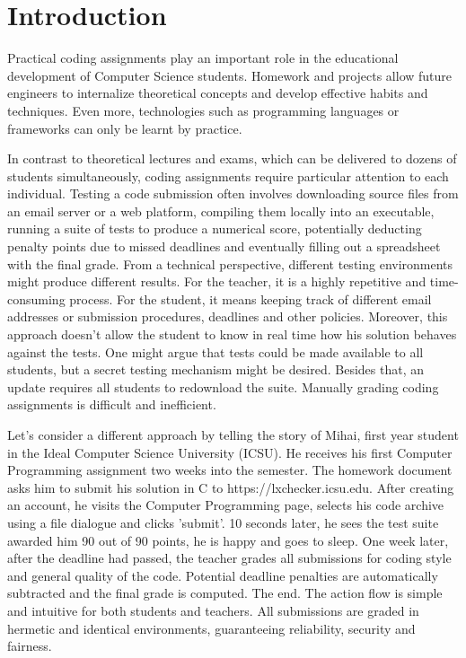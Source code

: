 \chapter{Introduction}
\label{chapter:intro}

Practical coding assignments play an important role in the educational development of Computer Science students. Homework and projects allow future engineers to internalize theoretical concepts and develop effective habits and techniques. Even more, technologies such as programming languages or frameworks can only be learnt by practice.

In contrast to theoretical lectures and exams, which can be delivered to dozens of students simultaneously, coding assignments require particular attention to each individual. Testing a code submission often involves downloading source files from an email server or a web platform, compiling them locally into an executable, running a suite of tests to produce a numerical score, potentially deducting penalty points due to missed deadlines and eventually filling out a spreadsheet with the final grade. From a technical perspective, different testing environments might produce different results. For the teacher, it is a highly repetitive and time-consuming process. For the student, it means keeping track of different email addresses or submission procedures, deadlines and other policies. Moreover, this approach doesn't allow the student to know in real time how his solution behaves against the tests. One might argue that tests could be made available to all students, but a secret testing mechanism might be desired. Besides that, an update requires all students to redownload the suite. Manually grading coding assignments is difficult and inefficient.

Let's consider a different approach by telling the story of Mihai, first year student in the Ideal Computer Science University (ICSU). He receives his first Computer Programming assignment two weeks into the semester. The homework document asks him to submit his solution in C to https://lxchecker.icsu.edu. After creating an account, he visits the Computer Programming page, selects his code archive using a file dialogue and clicks 'submit'. 10 seconds later, he sees the test suite awarded him 90 out of 90 points, he is happy and goes to sleep. One week later, after the deadline had passed, the teacher grades all submissions for coding style and general quality of the code. Potential deadline penalties are automatically subtracted and the final grade is computed. The end. The action flow is simple and intuitive for both students and teachers. All submissions are graded in hermetic and identical environments, guaranteeing reliability, security and fairness.


